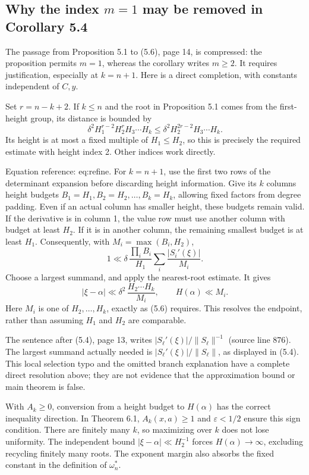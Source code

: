 \documentclass[10pt]{article}
\begin{document}
\subsection*{Why the index \(m=1\) may be removed in Corollary 5.4}
The passage from Proposition 5.1 to (5.6), page 14, is compressed: the proposition permits \(m=1\), whereas the corollary writes \(m\ge2\). It requires justification, especially at \(k=n+1\). Here is a direct completion, with constants independent of \(C,y\).\par
Set \(r=n-k+2\). If \(k\le n\) and the root in Proposition 5.1 comes from the first-height group, its distance is bounded by \[\delta^2 H_1^{r-2}H_2^r H_3\cdots H_k
 \le \delta^2 H_2^{2r-2}H_3\cdots H_k.\] Its height is at most a fixed multiple of \(H_1\le H_2\), so this is precisely the required estimate with height index 2. Other indices work directly.\par
Equation reference: eq:refine. For \(k=n+1\), use the first two rows of the determinant expansion before discarding height information. Give its \(k\) columns height budgets \(B_1=H_1,B_2=H_2,\ldots,B_k=H_k\), allowing fixed factors from degree padding. Even if an actual column has smaller height, these budgets remain valid. If the derivative is in column 1, the value row must use another column with budget at least \(H_2\). If it is in another column, the remaining smallest budget is at least \(H_1\). Consequently, with \(M_i=\max(B_i,H_2)\), \[
 1\ll \delta\,\frac{\prod_i B_i}{H_1}
          \sum_i\frac{|S_i'(\xi)|}{M_i}.\] Choose a largest summand, and apply the nearest-root estimate. It gives \[|\xi-\alpha|\ll
 \delta^2\,\frac{H_2\cdots H_k}{M_i},
 \qquad H(\alpha)\ll M_i.\] Here \(M_i\) is one of \(H_2,\ldots,H_k\), exactly as (5.6) requires. This resolves the endpoint, rather than assuming \(H_1\) and \(H_2\) are comparable.\par
The sentence after (5.4), page 13, writes \(|S_\ell'(\xi)|/\lVert S_\ell\rVert^{-1}\) (source line 876). The largest summand actually needed is \(|S_\ell'(\xi)|/\lVert S_\ell\rVert\), as displayed in (5.4). This local selection typo and the omitted branch explanation have a complete direct resolution above; they are not evidence that the approximation bound or main theorem is false.\par
With \(A_k\ge0\), conversion from a height budget to \(H(\alpha)\) has the correct inequality direction. In Theorem 6.1, \(A_k(x,a)\ge1\) and \(\varepsilon<1/2\) ensure this sign condition. There are finitely many \(k\), so maximizing over \(k\) does not lose uniformity. The independent bound \(|\xi-\alpha|\ll H_2^{-1}\) forces \(H(\alpha)\to\infty\), excluding recycling finitely many roots. The exponent margin also absorbs the fixed constant in the definition of \(\omega_n^*\).\par
\end{document}
